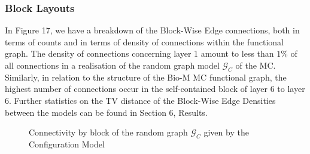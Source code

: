 \subsubsection{Block Layouts}
In Figure 17, we have a breakdown of the Block-Wise Edge connections, both in terms of counts and in terms of density of connections within the functional graph. The density of connections concerning layer 1 amount to less than $1\%$ of all connections in a realisation of the random graph model $\mathcal{G}_{C}$ of the MC. Similarly, in relation to the structure of the Bio-M MC functional graph, the highest number of connections occur in the self-contained block of layer 6 to layer 6. Further statistics on the TV distance of the Block-Wise Edge Densities between the models can be found in Section 6, Results.

\begin{figure}[H]%
    \centering
    \captionsetup{justification=centering}
    \qquad
    \caption{Connectivity by block of the random graph $\mathcal{G}_{C}$ given by the Configuration Model}%
    \label{fig:example}%
\end{figure}

